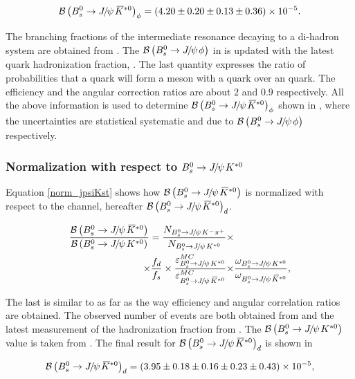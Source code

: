 \begin{equation}
  \centering
\BRof\BsJpsiKst_{\phi} = (4.20 \pm 0.20 \pm 0.13 \pm 0.36) \times 10^{-5}.
\label{Br_JpsiPhi}
\end{equation}

\noindent The branching fractions of the intermediate resonance decaying to a di-hadron system are obtained from \cite{PDG}.
The $\BRof\BsJpsiPhi$ in \cite{SheldonKK} is updated with the latest \bquark quark hadronization
fraction, \fdfs \cite{LHCb-CONF-2013-011}. The last quantity expresses the ratio of probabilities that a \bquark quark will form a meson with a
\dquark quark over an \squark quark. The efficiency and the angular correction ratios are about $2$ and $0.9$ respectively.
All the above information is used to determine $\BRof{\BsJpsiKst}_\phi$ shown in , where the uncertainties
are statistical systematic and due to  $\BRof\BsJpsiPhi$ respectively.

\subsubsection{Normalization with respect to $\BdJpsiKst$}
Equation \ref{norm_jpsiKst} shows how $\BRof\BsJpsiKst$ is normalized with respect to the \BdJpsiKst channel, hereafter $\BRof{\BsJpsiKst}_d$.

\begin{align}
  \centering
\frac{\BRof\BsJpsiKst}{\BRof\BdJpsiKst} = \frac{N_{\BsJpsiKpi}}{N_{\BdJpsiKst}} \times & \nonumber \\
                                   \times \fdfs
                                   \times \frac{\varepsilon_{\BdJpsiKst}^{MC}}{\varepsilon_{\BsJpsiKst}^{MC}}
                                   \times &\frac{\omega_{\BdJpsiKst}}{\omega_{\BsJpsiKst}},
\label{norm_jpsiKst}
\end{align}

\noindent The last is similar to  as far as the way efficiency and angular correlation ratios are obtained.
The observed number of events are both obtained from  and the latest measurement of the hadronization
fraction from \cite{LHCb-CONF-2013-011}. The $\BRof\BdJpsiKst$ value is taken from \cite{Abe:2002haa}. 
The final result for $\BRof{\BsJpsiKst}_d$ is shown in 

\begin{equation}
  \centering
\BRof\BsJpsiKst_{d} = (3.95 \pm 0.18 \pm 0.16 \pm 0.23 \pm 0.43 )\times 10^{-5},
\label{Br_JpsiKst}
\end{equation}

